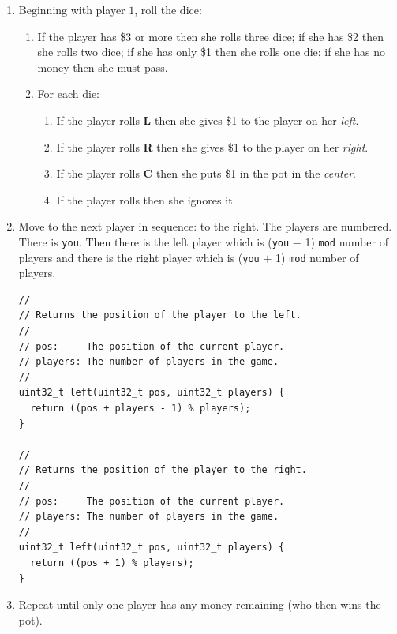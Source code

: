\documentclass{article}
\begin{document}
\begin{enumerate}
\item
Beginning with player $1$, roll the dice:
\begin{enumerate}
\item
If the player has \$3 or more then she rolls three dice;
if she has \$2 then she rolls two dice;
if she has only \$1 then she rolls one die;
if she has no money then she must pass.

\item For each die:
\begin{enumerate}
\item If the player rolls \textbf{L} then she gives \$1 to the player on her \emph{left}.

\item If the player rolls \textbf{R} then she gives \$1 to the player on her \emph{right}.

\item If the player rolls \textbf{C} then she puts \$1 in the pot in the
    \emph{center}.

\item If the player rolls \textbf{\textbullet} then she ignores it.
\end{enumerate}

\end{enumerate}
\item Move to the next player in sequence: to the
right. The players are numbered. There is \texttt{you}. Then there
is the left player which is (\texttt{you} $-$ 1) \texttt{mod} number
of players and there is the right player which is (\texttt{you} $+$
1) \texttt{mod} number of players.
\begin{lstlisting}
//
// Returns the position of the player to the left.
//
// pos:     The position of the current player.
// players: The number of players in the game.
//
uint32_t left(uint32_t pos, uint32_t players) {
  return ((pos + players - 1) % players);
}

//
// Returns the position of the player to the right.
//
// pos:     The position of the current player.
// players: The number of players in the game.
//
uint32_t left(uint32_t pos, uint32_t players) {
  return ((pos + 1) % players);
}
\end{lstlisting}

\item Repeat until only one player has any money remaining (who then wins the pot).
\end{enumerate}
\end{document}

